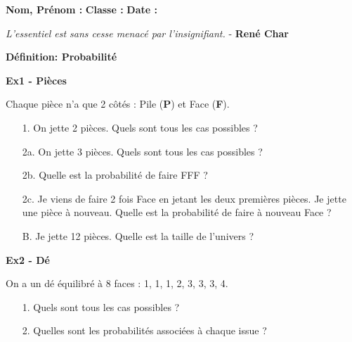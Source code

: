 



\textbf{Nom, Prénom :} \hspace{8cm} \textbf{Classe :} \hspace{3cm} \textbf{Date :}\\

\begin{center}
  \textit{L’essentiel est sans cesse menacé par l’insignifiant.} - \textbf{René Char}
\end{center}

\textbf{Définition: Probabilité} \\ \Pointilles[4]

\textbf{Ex1 - Pièces}

Chaque pièce n'a que 2 côtés : Pile (\textbf{P}) et Face (\textbf{F}).

\begin{enumerate}
  \item[1.] On jette 2 pièces. Quels sont tous les cas possibles ? \\\Pointilles[2]
  \item[2a.] On jette 3 pièces. Quels sont tous les cas possibles ? \\\Pointilles[3]
  \item[2b.] Quelle est la probabilité de faire FFF ?  \\\Pointilles[2]
  \item[2c.] Je viens de faire 2 fois Face en jetant les deux premières pièces. Je jette une pièce à nouveau. Quelle est la probabilité de faire à nouveau Face ? \\\Pointilles[1]
  \item[B.] Je jette 12 pièces. Quelle est la taille de l'univers ? \\\Pointilles[2]
\end{enumerate}  

\textbf{Ex2 - Dé}

On a un dé équilibré à 8 faces : 1, 1, 1, 2, 3, 3, 3, 4.

\begin{enumerate}
  \item[1.] Quels sont tous les cas possibles ? \\ \Pointilles[2]
  \item[2.] Quelles sont les probabilités associées à chaque issue ? \\ \Pointilles[2]
\end{enumerate}  

\newpage

